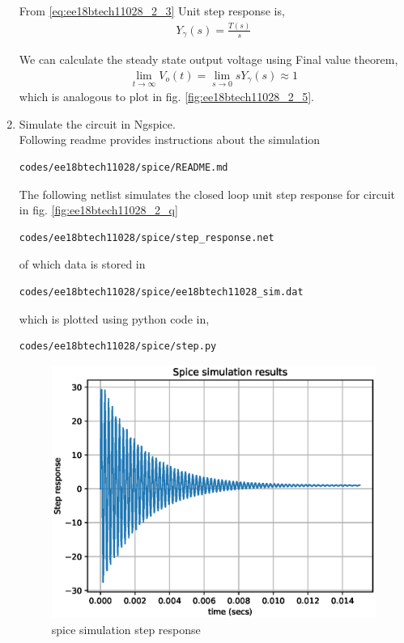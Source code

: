 \begin{enumerate}[label=\arabic*.,ref=\theenumi]
From \eqref{eq:ee18btech11028_2_3} Unit step response is,
\begin{align}
    Y_{\gamma}(s) = \frac{T(s)}{s}
\end{align}

We can calculate the steady state output voltage using Final value theorem,
\begin{align}
    \lim_{t\to\infty} V_{o}(t) = \lim_{s \to 0} sY_{\gamma}(s) \approx 1
\end{align}
which is analogous to plot in fig. \ref{fig:ee18btech11028_2_5}.
\item Simulate the circuit in Ngspice.
\\
\solution Following readme provides instructions about the simulation

\begin{lstlisting}
codes/ee18btech11028/spice/README.md
\end{lstlisting}

The following netlist simulates the closed loop unit step response for circuit in fig. \ref{fig:ee18btech11028_2_q}
\begin{lstlisting}
codes/ee18btech11028/spice/step_response.net
\end{lstlisting}
of which data is stored in 
\begin{lstlisting}
codes/ee18btech11028/spice/ee18btech11028_sim.dat
\end{lstlisting}
which is plotted using python code in,
\begin{lstlisting}
codes/ee18btech11028/spice/step.py
\end{lstlisting}
\begin{figure}[!ht]
    \centering
    \includegraphics[width=\columnwidth]{./figs/ee18btech11028/spice_step_response.eps}
    \caption{spice simulation step response}
    \label{fig:ee18btech11028_2_6}
\end{figure}


\end{enumerate}

